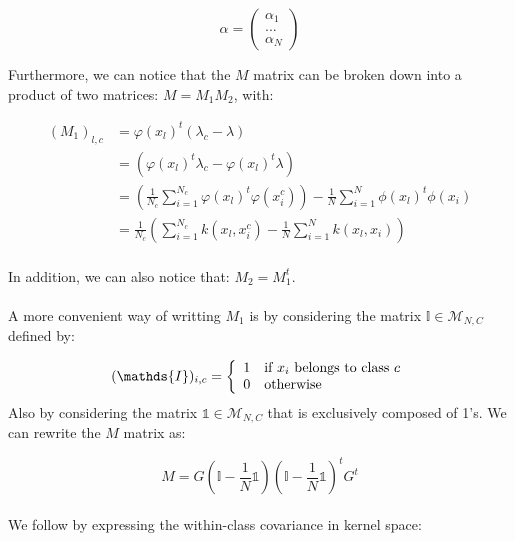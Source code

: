 \begin{equation*}
\alpha = \left( \begin{array}{c}
                                \alpha_1 \\
                                ... \\
                                \alpha_N
                  \end{array}  \right) 
\end{equation*}

Furthermore, we can notice that the $M$ matrix can be broken down into a product of two matrices: $ M = M_1M_2$, with:

\begin{align*}
(M_1)_{l, c} &= \varphi(x_l)^t(\lambda_c - \lambda)\\
             &= (\varphi(x_l)^t\lambda_c -\varphi(x_l)^t\lambda) \\
             &= \left( \frac{1}{N_c} \sum_{i=1}^{N_c} \varphi(x_l)^t\varphi(x_i^c)\right) -
                 \frac{1}{N}\sum_{i=1}^N\phi(x_l)^t\phi(x_i) \\
             &= \frac{1}{N_c} \left(\sum_{i = 1}^{N_c} k(x_l, x_i^c) -
                \frac{1}{N}\sum_{i=1}^N k(x_l, x_i) \right)\\
\end{align*}

In addition, we can also notice that: $M_2 = M_1^t$.

\paragraph{}
A more convenient way of writting $M_1$ is by considering the matrix $\mathds{I} \in
\mathcal{M}_{N,C}$ defined by:

$$ (\mathds{I})_{i, c} = \left\{ \begin{array}{ll}
                                  1 & \textnormal{if $x_i$ belongs to class $c$} \\
                                  0 & \textnormal{otherwise}
                               \end{array}
                        \right.$$
Also by considering the matrix $\mathds{1} \in \mathcal{M}_{N,C}$ that is exclusively composed of
1's.
We can rewrite the $M$ matrix as:

$$M = G\left( \mathds{I} - \frac{1}{N} \mathds{1} \right)\left( \mathds{I} - \frac{1}{N} \mathds{1}\right)^tG^t$$

\paragraph{}
We follow by expressing the within-class covariance in kernel space:

